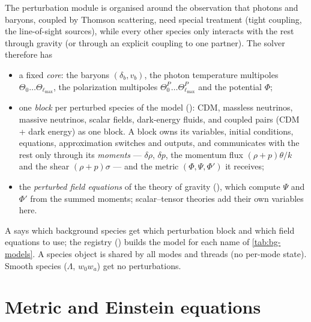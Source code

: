 The perturbation module is organised around the observation that photons and baryons, coupled by Thomson scattering,
need special treatment (tight coupling, the line-of-sight sources), while every other species only interacts with
the rest through gravity (or through an explicit coupling to one partner). The solver therefore has
\begin{itemize}
\item a fixed \emph{core}: the baryons $(\delta_b,v_b)$, the photon temperature multipoles $\Theta_0\ldots
      \Theta_{\ell_{\max}}$, the polarization multipoles $\Theta^P_0\ldots\Theta^P_{\ell_{\max}}$ and the potential
      $\Phi$;
\item one \emph{block} per perturbed species of the model (): CDM, massless neutrinos,
      massive neutrinos, scalar fields, dark-energy fluids, and coupled pairs (CDM + dark energy) as one block. A block
      owns its variables, initial conditions, equations, approximation switches and outputs, and communicates with the
      rest only through its \emph{moments} --- $\delta\rho$, $\delta p$, the momentum flux $(\rho+p)\theta/k$ and the
      shear $(\rho+p)\sigma$ --- and the metric $(\Phi,\Psi,\Phi')$ it receives;
\item the \emph{perturbed field equations} of the theory of gravity (), which compute
      $\Psi$ and $\Phi'$ from the summed moments; scalar--tensor theories add their own variables here.
\end{itemize}
A  says which background species get which perturbation block and which field equations to
use; the registry () builds the model for each name of \cref{tab:bg-models}. A species object is shared
by all modes and threads (no per-mode state). Smooth species ($\Lambda$, $w_0w_a$) get no perturbations.

\section{Metric and Einstein equations}

